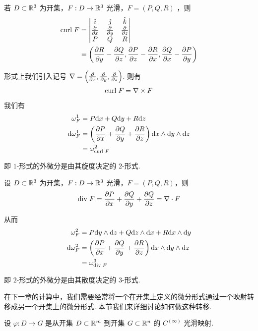\begin{example}[ 旋度]
    若 $D\subset\mathbb{R}^3$ 为开集，$F:D\to\mathbb{R}^3$ 光滑，$F=(P,Q,R)$ ，则
$$
\begin{aligned}
\mathrm{curl}\; F&=\begin{vmatrix}
    \hat{\imath} & \hat{\jmath} & \hat{k}\\
    \frac{\partial{}}{\partial{x}} & \frac{\partial{}}{\partial{y}} & \frac{\partial{}}{\partial{z}}\\
    P & Q & R
\end{vmatrix}\\
&=\left(\frac{\partial{R}}{\partial{y}}-\frac{\partial{Q}}{\partial{z}},\frac{\partial{P}}{\partial{z}}-\frac{\partial{R}}{\partial{x}},\frac{\partial{Q}}{\partial{x}}-\frac{\partial{P}}{\partial{y}}\right)
\end{aligned}
$$

    形式上我们引入记号 $\nabla=\left(\frac{\partial{}}{\partial{x}},\frac{\partial{}}{\partial{y}},\frac{\partial{}}{\partial{z}}\right)$. 则有
$$
\mathrm{curl}\; F=\nabla\times F
$$

    我们有
$$
\begin{aligned}
\omega_F^1&=P\mathrm{d} x+Q\mathrm{d} y+R\mathrm{d} z\\
\mathrm{d}\omega_F^1&=\left(\frac{\partial{P}}{\partial{x}}+\frac{\partial{Q}}{\partial{y}}+\frac{\partial{R}}{\partial{z}}\right)\mathrm{d} x\wedge\mathrm{d} y\wedge\mathrm{d} z\\
&=\omega_{\mathrm{curl}\; F}^2
\end{aligned}
$$

    即 $1$-形式的外微分是由其旋度决定的 $2$-形式.
\end{example}

\begin{example}[ 散度]
    设 $D\subset\mathbb{R}^3$ 为开集，$F:D\to\mathbb{R}^3$ 光滑，$F=(P,Q,R)$，则
$$
\mathrm{div}\; F=\frac{\partial{P}}{\partial{x}}+\frac{\partial{Q}}{\partial{y}}+\frac{\partial{Q}}{\partial{z}}=\nabla\cdot F
$$

    从而
$$
\begin{aligned}
    \omega_{F}^2&=P\mathrm{d} y\wedge\mathrm{d} z+Q\mathrm{d} z\wedge\mathrm{d} x+R\mathrm{d} x\wedge\mathrm{d} y\\
    \mathrm{d}\omega_F^2&=\left(\frac{\partial{P}}{\partial{x}}+\frac{\partial{Q}}{\partial{y}}+\frac{\partial{R}}{\partial{z}}\right)\mathrm{d} x\wedge\mathrm{d} y\wedge\mathrm{d} z\\
    &=\omega_{\mathrm{div}\; F}^3
\end{aligned}
$$

    即 $2$-形式的外微分是由其散度决定的 $3$-形式.
\end{example}


在下一章的计算中，我们需要经常将一个在开集上定义的微分形式通过一个映射转移成另一个开集上的微分形式. 本节我们来详细讨论如何做这种转移.

设 $\varphi:D\to G$ 是从开集 $D\subset\mathbb{R}^m$ 到开集 $G\subset\mathbb{R}^n$ 的 $C^{(\infty)}$ 光滑映射.

